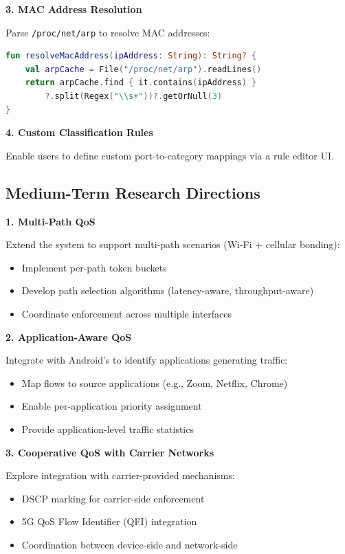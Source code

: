 \textbf{3. MAC Address Resolution}

Parse \texttt{/proc/net/arp} to resolve MAC addresses:
\begin{lstlisting}[language=Kotlin]
fun resolveMacAddress(ipAddress: String): String? {
    val arpCache = File("/proc/net/arp").readLines()
    return arpCache.find { it.contains(ipAddress) }
        ?.split(Regex("\\s+"))?.getOrNull(3)
}
\end{lstlisting}

\textbf{4. Custom Classification Rules}

Enable users to define custom port-to-category mappings via a rule editor UI.

\subsection{Medium-Term Research Directions}

\textbf{1. Multi-Path QoS}

Extend the system to support multi-path scenarios (Wi-Fi + cellular bonding):
\begin{itemize}
    \item Implement per-path token buckets
    \item Develop path selection algorithms (latency-aware, throughput-aware)
    \item Coordinate \qos enforcement across multiple interfaces
\end{itemize}

\textbf{2. Application-Aware QoS}

Integrate with Android's  to identify applications generating traffic:
\begin{itemize}
    \item Map flows to source applications (e.g., Zoom, Netflix, Chrome)
    \item Enable per-application priority assignment
    \item Provide application-level traffic statistics
\end{itemize}

\textbf{3. Cooperative QoS with Carrier Networks}

Explore integration with carrier-provided \qos mechanisms:
\begin{itemize}
    \item DSCP marking for carrier-side \qos enforcement
    \item 5G QoS Flow Identifier (QFI) integration
    \item Coordination between device-side and network-side \qos
\end{itemize}

